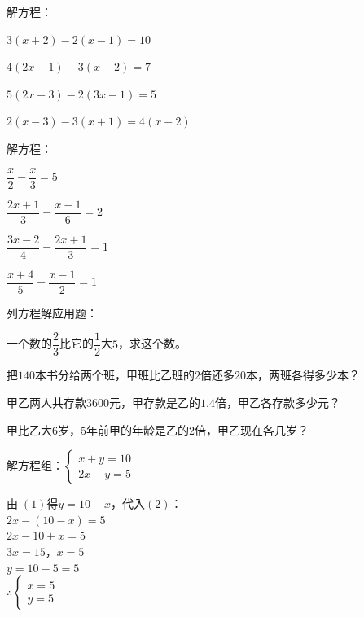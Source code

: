 \documentclass[a4paper,12pt]{ctexart}
\begin{document}
\begin{exercise}
\item 解方程：
  \begin{subexercise}
    \item $3(x+2)-2(x-1)=10$
    \item $4(2x-1)-3(x+2)=7$
    \item $5(2x-3)-2(3x-1)=5$
    \item $2(x-3)-3(x+1)=4(x-2)$
  \end{subexercise}

\item 解方程：
  \begin{subexercise}
    \item $\dfrac{x}{2}-\dfrac{x}{3}=5$
    \item $\dfrac{2x+1}{3}-\dfrac{x-1}{6}=2$
    \item $\dfrac{3x-2}{4}-\dfrac{2x+1}{3}=1$
    \item $\dfrac{x+4}{5}-\dfrac{x-1}{2}=1$
  \end{subexercise}

\item 列方程解应用题：
  \begin{subexercise}
    \item 一个数的$\dfrac{2}{3}$比它的$\dfrac{1}{2}$大$5$，求这个数。
    \item 把$140$本书分给两个班，甲班比乙班的$2$倍还多$20$本，两班各得多少本？
    \item 甲乙两人共存款$3600$元，甲存款是乙的$1.4$倍，甲乙各存款多少元？
    \item 甲比乙大$6$岁，$5$年前甲的年龄是乙的$2$倍，甲乙现在各几岁？
  \end{subexercise}
\end{exercise}

\newpage




\begin{example}
解方程组：$\begin{cases}x+y=10\\2x-y=5\end{cases}$
\end{example}
\begin{solution}
由$\;$\;$(1)$得$y=10-x$，代入$(2)$：\\
$2x-(10-x)=5$\\
$2x-10+x=5$\\
$3x=15$，$x=5$\\
$y=10-5=5$\\
$\therefore\begin{cases}x=5\\y=5\end{cases}$
\end{solution}
\end{document}
